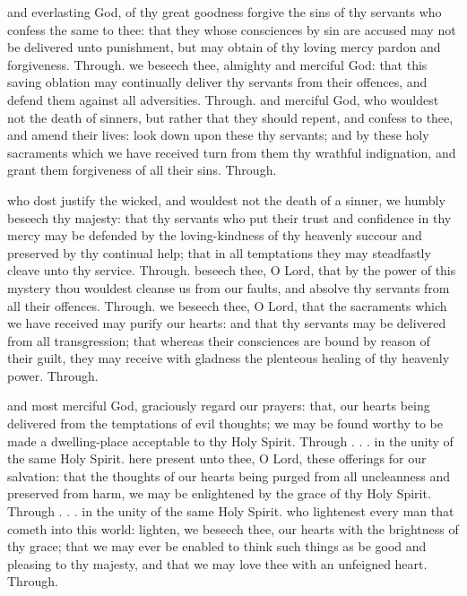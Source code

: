 \begin{multicols}{2}
\vspace{3\baselineskip}

 and everlasting God, of thy great goodness forgive the sins of thy servants who confess the same to thee: that they whose consciences by sin are accused may not be delivered unto punishment, but may obtain of thy loving mercy pardon and forgiveness. Through.
 we beseech thee, almighty and merciful God: that this saving oblation may continually deliver thy servants from their offences, and defend them against all adversities. Through.
 and merciful God, who wouldest not the death of sinners, but rather that they should repent, and confess to thee, and amend their lives: look down upon these thy servants; and by these holy sacraments which we have received turn from them thy wrathful indignation, and grant them forgiveness of all their sins. Through.

 who dost justify the wicked, and wouldest not the death of a sinner, we humbly beseech thy majesty: that thy servants who put their trust and confidence in thy mercy may be defended by the loving-kindness of thy heavenly succour and preserved by thy continual help; that in all temptations they may steadfastly cleave unto thy service. Through.
 beseech thee, O Lord, that by the power of this mystery thou wouldest cleanse us from our faults, and absolve thy servants from all their offences. Through.
 we beseech thee, O Lord, that the sacraments which we have received may purify our hearts: and that thy servants may be delivered from all transgression; that whereas their consciences are bound by reason of their guilt, they may receive with gladness the plenteous healing of thy heavenly power. Through.

 and most merciful God, graciously regard our prayers: that, our hearts being delivered from the temptations of evil thoughts; we may be found worthy to be made a dwelling-place acceptable to thy Holy Spirit. Through . . . in the unity of the same Holy Spirit.
 here present unto thee, O Lord, these offerings for our salvation: that the thoughts of our hearts being purged from all uncleanness and preserved from harm, we may be enlightened by the grace of thy Holy Spirit. Through . . . in the unity of the same Holy Spirit.
 who lightenest every man that cometh into this world: lighten, we beseech thee, our hearts with the brightness of thy grace; that we may ever be enabled to think such things as be good and pleasing to thy majesty, and that we may love thee with an unfeigned heart. Through.


\end{multicols}
